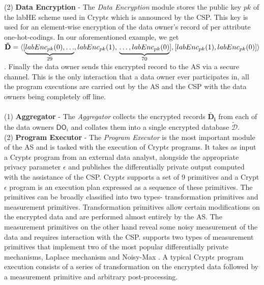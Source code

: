 (2)\textbf{ Data Encryption} - The \textit{Data Encryption} module stores the public key $pk$ of the labHE scheme used in Crypt$\epsilon$ which is announced by the CSP. This key is used for an element-wise encryption of the data owner's  record of per attribute one-hot-codings. In our aforementioned example, we get $\mathbf{\tilde{D}}=\langle[\underbrace{labEnc_{pk}(0),\ldots}_{29},labEnc_{pk}(1),\\\underbrace{\ldots,labEnc_{pk}(0)}_{70}],
[labEnc_{pk}(1),labEnc_{pk}(0)]\rangle$. Finally the data owner sends this encrypted record to the \textsf{AS} via a secure channel. This is the only interaction that a data owner ever participates in, all the program executions are carried out by the \textsf{AS} and the \textsf{CSP} with the data owners being completely off line.\\
\\
(1)\textbf{  Aggregator} - The \textit{Aggregator} collects the encrypted records $\mathbf{\tilde{D_i}}$ from each of the data owners $\textsf{DO}_i$ and collates them into a single encrypted database $\boldsymbol{\tilde{\mathcal{D}}}$. %
\\(2)\textbf{ Program Executor }- The \textit{Program Executor} is the most important module of the \textsf{AS} and is tasked with the execution of Crypt$\epsilon$ programs. It takes as input a Crypt$\epsilon$ program from an external data analyst, alongside the appropriate privacy parameter $\epsilon$ and publishes the differentially private output computed with the assistance of the \textsf{CSP}. Crypt$\epsilon$ supports a set of 9 primitives and a Crypt$\epsilon$ program is an execution plan expressed as a sequence of these primitives. The primitives can be broadly classified into two types- transformation primitives and measurement primitives. Transformation primitives allow certain modifications on the encrypted data and are performed almost entirely by the \textsf{AS}. The measurement primitives on the other hand reveal some noisy measurement of the data and requires interaction with the \textsf{CSP}. \system supports two types of measurement primitives that implement two of the most popular differentially private mechanisms, Laplace mechanism \cite{Dork} and Noisy-Max \cite{Dork}. A typical Crypt$\epsilon$ program execution consists of  a series of transformation on the encrypted data followed by a measurement primitive and arbitrary post-processing. \\

